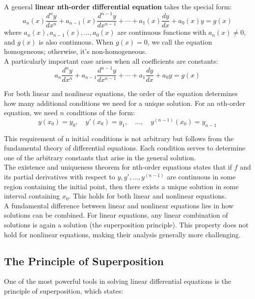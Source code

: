 \noindent A general \textbf{linear nth-order differential equation} takes the special form:
\[
a_n(x)\frac{d^ny}{dx^n} + a_{n-1}(x)\frac{d^{n-1}y}{dx^{n-1}} + \cdots + a_1(x)\frac{dy}{dx} + a_0(x)y = g(x)
\]
where $a_n(x), a_{n-1}(x), \ldots, a_0(x)$ are continuous functions with $a_n(x) \neq 0$, and $g(x)$ is also continuous. When $g(x) = 0$, we call the equation homogeneous; otherwise, it's non-homogeneous. \\

\noindent A particularly important case arises when all coefficients are constants:
\[
a_n\frac{d^ny}{dx^n} + a_{n-1}\frac{d^{n-1}y}{dx^{n-1}} + \cdots + a_1\frac{dy}{dx} + a_0y = g(x)
\]

\noindent For both linear and nonlinear equations, the order of the equation determines how many additional conditions we need for a unique solution. For an $n$th-order equation, we need $n$ conditions of the form:
\[
y(x_0) = y_0, \quad y'(x_0) = y_1, \quad \ldots, \quad y^{(n-1)}(x_0) = y_{n-1}
\]

\noindent This requirement of n initial conditions is not arbitrary but follows from the fundamental theory of differential equations. Each condition serves to determine one of the arbitrary constants that arise in the general solution. \\

\noindent The existence and uniqueness theorem for nth-order equations states that if $f$ and its partial derivatives with respect to $y, y', ..., y^{(n-1)}$ are continuous in some region containing the initial point, then there exists a unique solution in some interval containing $x_0$. This holds for both linear and nonlinear equations. \\

\noindent A fundamental difference between linear and nonlinear equations lies in how solutions can be combined. For linear equations, any linear combination of solutions is again a solution (the superposition principle). This property does not hold for nonlinear equations, making their analysis generally more challenging.

\subsection*{The Principle of Superposition} 

\noindent One of the most powerful tools in solving linear differential equations is the principle of superposition, which states:

